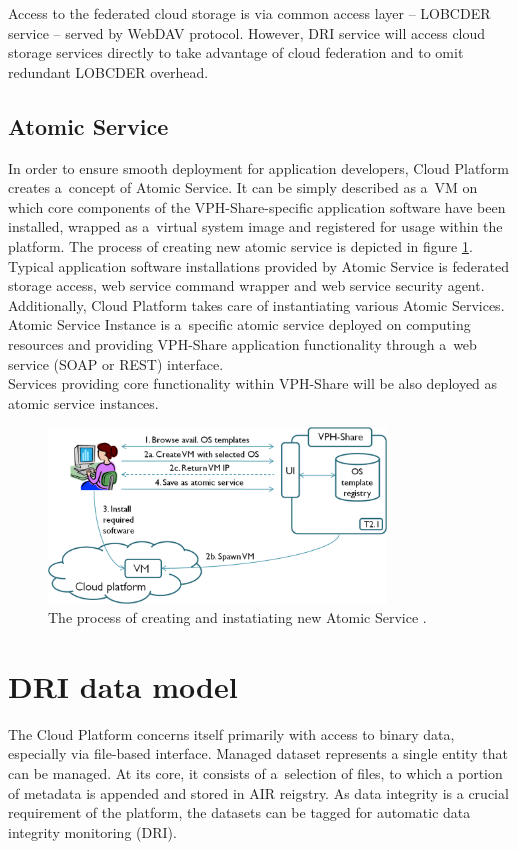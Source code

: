 Access to the federated cloud storage is via common access layer -- LOBCDER
service -- served by WebDAV protocol. However, DRI service will access
cloud storage services directly to take advantage of cloud federation and
to omit redundant LOBCDER overhead.

\subsection{Atomic Service}
\label{atomic-service}
In order to ensure smooth deployment for application developers, Cloud Platform
creates a~concept of Atomic Service. It can be simply described as a~VM on which
core components of the VPH-Share-specific application software have been installed,
wrapped as a~virtual system image and registered for usage within the platform. The
process of creating new atomic service is depicted in figure \ref{fig:atomic-service}.
Typical application software installations provided by Atomic Service is federated
storage access, web service command wrapper and web service security agent. Additionally,
Cloud Platform takes care of instantiating various Atomic Services. Atomic Service
Instance is a~specific atomic service deployed on computing resources and providing
VPH-Share application functionality through a~web service (SOAP or REST) interface.\\

Services providing core functionality within VPH-Share will be also deployed as atomic
service instances. 

\begin{figure}[h!]
	\centering
	\includegraphics[width=0.8\textwidth]{images/vph-atomic-service.png}
	\caption{The process of creating and instatiating new Atomic Service
	\cite{vph-deliverable-2-2}.}
	\label{fig:atomic-service}
\end{figure}


\section{DRI data model}
The Cloud Platform concerns itself primarily with access to binary data, 
especially via file-based interface. Managed dataset represents a single entity
that can be managed. At its core, it consists of a~selection of
files, to which a portion of metadata is appended and stored in AIR reigstry. 
As data integrity is a crucial requirement of the platform, the datasets can be
tagged for automatic data integrity monitoring (DRI). 

